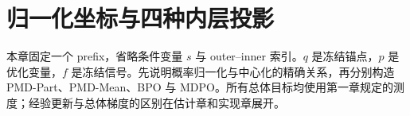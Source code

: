 \chapter{归一化坐标与四种内层投影}
\label{ch:four-methods}
本章固定一个 prefix，省略条件变量 $s$ 与 outer--inner 索引。$q$ 是冻结锚点，$p$ 是优化变量，$f$ 是冻结信号。先说明概率归一化与中心化的精确关系，再分别构造 PMD-Part、PMD-Mean、BPO 与 MDPO。所有总体目标均使用第一章规定的测度；经验更新与总体梯度的区别在估计章和实现章展开。





